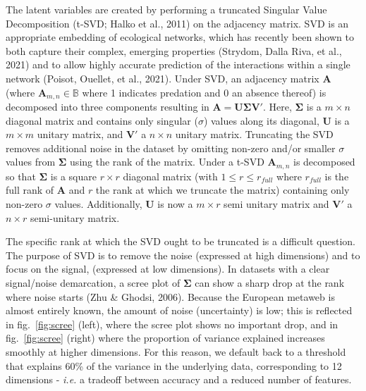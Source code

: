 \documentclass[10pt,oneside]{article}
\begin{document}
The latent variables are created by performing a truncated Singular
Value Decomposition (t-SVD; Halko et al., 2011) on the adjacency matrix.
SVD is an appropriate embedding of ecological networks, which has
recently been shown to both capture their complex, emerging properties
(Strydom, Dalla Riva, et al., 2021) and to allow highly accurate
prediction of the interactions within a single network (Poisot, Ouellet,
et al., 2021). Under SVD, an adjacency matrix \(\mathbf{A}\) (where
\(\mathbf{A}_{m,n}\in\mathbb{B}\) where 1 indicates predation and 0 an
absence thereof) is decomposed into three components resulting in
\(\mathbf{A} = \mathbf{U}\mathbf{\Sigma}\mathbf{V'}.\) Here,
\(\mathbf{\Sigma}\) is a \(m \times n\) diagonal matrix and contains
only singular (\(\sigma\)) values along its diagonal, \(\mathbf{U}\) is
a \(m \times m\) unitary matrix, and \(\mathbf{V}'\) a \(n \times n\)
unitary matrix. Truncating the SVD removes additional noise in the
dataset by omitting non-zero and/or smaller \(\sigma\) values from
\(\mathbf{\Sigma}\) using the rank of the matrix. Under a t-SVD
\(\mathbf{A}_{m,n}\) is decomposed so that \(\mathbf{\Sigma}\) is a
square \(r \times r\) diagonal matrix (with \(1 \le r \le r_{full}\)
where \(r_{full}\) is the full rank of \(\mathbf{A}\) and \(r\) the rank
at which we truncate the matrix) containing only non-zero \(\sigma\)
values. Additionally, \(\mathbf{U}\) is now a \(m \times r\) semi
unitary matrix and \(\mathbf{V}'\) a \(n \times r\) semi-unitary matrix.

The specific rank at which the SVD ought to be truncated is a difficult
question. The purpose of SVD is to remove the noise (expressed at high
dimensions) and to focus on the signal, (expressed at low dimensions).
In datasets with a clear signal/noise demarcation, a scree plot of
\(\mathbf{\Sigma}\) can show a sharp drop at the rank where noise starts
(Zhu \& Ghodsi, 2006). Because the European metaweb is almost entirely
known, the amount of noise (uncertainty) is low; this is reflected in
fig.~\ref{fig:scree} (left), where the scree plot shows no important
drop, and in fig.~\ref{fig:scree} (right) where the proportion of
variance explained increases smoothly at higher dimensions. For this
reason, we default back to a threshold that explains 60\% of the
variance in the underlying data, corresponding to 12 dimensions -
\emph{i.e.} a tradeoff between accuracy and a reduced number of
features.
\end{document}
